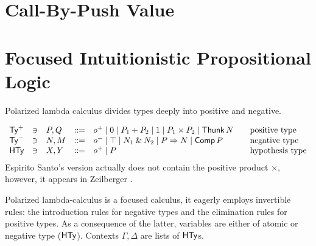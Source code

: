 \documentclass[a4paper,USenglish,cleveref, autoref]{lipics-v2019}
\begin{document}
\section{Call-By-Push Value}
\label{sec:cbpv}

\section{Focused Intuitionistic Propositional Logic}
\label{sec:fipl}

Polarized lambda calculus \cite{espiritoSanto:entcs17}
divides types deeply into positive and negative.

\[
\begin{array}{lllrl@{\qquad}l}
  \PTy & \ni & P,Q & ::= & \patom
    \mid \tyzero \mid P_1 + P_2
    \mid \tyone \mid P_1 \times P_2
    \mid \Thunk N
  & \mbox{positive type}
\\
  \NTy & \ni & N,M & ::= & \natom
    \mid \top \mid N_1 \ntimes N_2
    \mid P \To N
    \mid \Comp P
  & \mbox{negative type}
\\
  \HTy & \ni & X,Y & ::= & \patom \mid P
  & \mbox{hypothesis type}
\\
\end{array}
\]
Espirito Santo's version actually does not contain the positive
product $\times$, however, it appears in Zeilberger
\cite{zeilberger:PhD}.

Polarized lambda-calculus is a focused calculus, it eagerly employs
invertible rules: the introduction rules for negative types and the
elimination rules for positive types.  As a consequence of the latter,
variables are either of atomic or negative type ($\mathsf{HTy}$).
Contexts $\Gamma,\Delta$ are lists of $\mathsf{HTy}$s.
\end{document}
